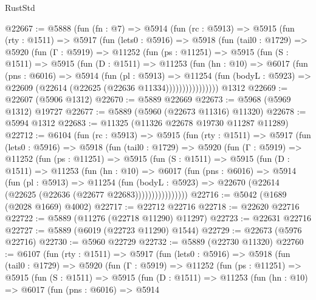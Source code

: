\begin{lexlean}{RustStd}
\begin{coremodule}
@22667 := @5888
    (fun (fn : @7) =>
    @5914
      (fun (rc : @5913) =>
      @5915
        (fun (rty : @1511) =>
        @5917
          (fun (lets0 : @5916) =>
          @5918
            (fun (tail0 : @1729) =>
            @5920
              (fun (Γ : @5919) =>
              @11252
                (fun (ps : @11251) =>
                @5915
                  (fun (S : @1511) =>
                  @5915
                    (fun (D : @1511) =>
                    @11253
                      (fun (hn : @10) =>
                      @6017
                        (fun (pns : @6016) =>
                        @5914
                          (fun (pl : @5913) =>
                          @11254
                            (fun (bodyL : @5923) =>
                            @22609 (@22614 (@22625 (@22636 @11334))))))))))))))))
    @1312
@22669 := @22607 (@5906 @1312)
@22670 := @5889 @22669
@22673 := @5968 (@5969 @1312) @19727
@22677 := @5889 (@5960 (@22673 @11316) @11320)
@22678 := @5994 @1312
@22683 := @11325 (@11326 @22678 @19730 @11287 @11289)
@22712 := @6104
    (fun (rc : @5913) =>
    @5915
      (fun (rty : @1511) =>
      @5917
        (fun (lets0 : @5916) =>
        @5918
          (fun (tail0 : @1729) =>
          @5920
            (fun (Γ : @5919) =>
            @11252
              (fun (ps : @11251) =>
              @5915
                (fun (S : @1511) =>
                @5915
                  (fun (D : @1511) =>
                  @11253
                    (fun (hn : @10) =>
                    @6017
                      (fun (pns : @6016) =>
                      @5914
                        (fun (pl : @5913) =>
                        @11254
                          (fun (bodyL : @5923) =>
                          @22670 (@22614 (@22625 (@22636 (@22677 @22683))))))))))))))))
@22716 := @5042 (@1689 (@2028 @1669) @4002)
@22717 := @22712 @22716
@22718 := @22620 @22716
@22722 := @5889 (@11276 (@22718 @11290) @11297)
@22723 := @22631 @22716
@22727 := @5889 (@6019 (@22723 @11290) @1544)
@22729 := @22673 (@5976 @22716)
@22730 := @5960 @22729
@22732 := @5889 (@22730 @11320)
@22760 := @6107
    (fun (rty : @1511) =>
    @5917
      (fun (lets0 : @5916) =>
      @5918
        (fun (tail0 : @1729) =>
        @5920
          (fun (Γ : @5919) =>
          @11252
            (fun (ps : @11251) =>
            @5915
              (fun (S : @1511) =>
              @5915
                (fun (D : @1511) =>
                @11253
                  (fun (hn : @10) =>
                  @6017
                    (fun (pns : @6016) =>
                    @5914

\end{coremodule}
\end{lexlean}
